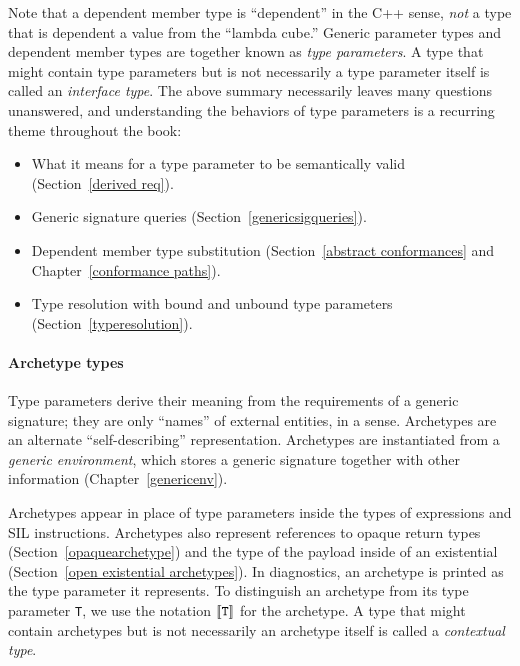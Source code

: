 \documentclass[../generics]{subfiles}
\begin{document}
Note that a dependent member type is ``dependent'' in the C++ sense, \emph{not} a type that is dependent a value from the ``lambda cube.'' Generic parameter types and dependent member types are together known as \emph{type parameters}. A type that might contain type parameters but is not necessarily a type parameter itself is called an \emph{interface type}. The above summary necessarily leaves many questions unanswered, and understanding the behaviors of type parameters is a recurring theme throughout the book:
\begin{itemize}
\item What it means for a type parameter to be semantically valid (Section~\ref{derived req}).
\item Generic signature queries (Section~\ref{genericsigqueries}).
\item Dependent member type substitution (Section~\ref{abstract conformances} and Chapter~\ref{conformance paths}).
\item Type resolution with bound and unbound type parameters (Section~\ref{typeresolution}).
\end{itemize}

\paragraph{Archetype types}
Type parameters derive their meaning from the requirements of a generic signature; they are only ``names'' of external entities, in a sense. Archetypes are an alternate ``self-describing'' representation. Archetypes are instantiated from a \emph{generic environment}, which stores a generic signature together with other information (Chapter~\ref{genericenv}).

Archetypes appear in place of type parameters inside the types of expressions and SIL instructions. Archetypes also represent references to opaque return types (Section~\ref{opaquearchetype}) and the type of the payload inside of an existential (Section~\ref{open existential archetypes}). In diagnostics, an archetype is printed as the type parameter it represents. To distinguish an archetype from its type parameter \texttt{T}, we use the notation $[\![\texttt{T}]\!]$ for the archetype. A type that might contain archetypes but is not necessarily an archetype itself is called a \emph{contextual type}.

\medskip
\end{document}
